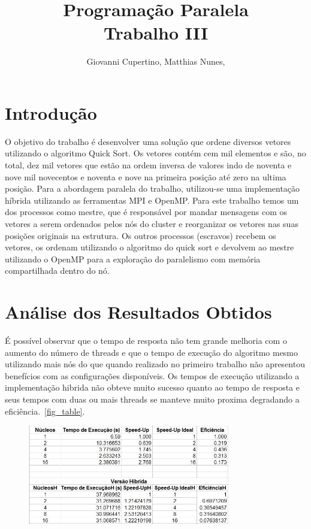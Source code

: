 \documentclass[10pt]{IEEEtran}
\title{Programação Paralela\\ Trabalho III}
\author{Giovanni Cupertino, Matthias Nunes, \IEEEmembership{Usuário pp12820}}
\begin{document}
\maketitle

\section{Introdução}

	O objetivo do trabalho é desenvolver uma solução que ordene diversos vetores
	utilizando o algoritmo Quick Sort.  Os vetores contém cem mil elementos e
	são, no total, dez mil vetores que estão na ordem inversa de valores indo de
	noventa e nove mil novecentos e noventa e nove na primeira posição até zero
	na ultima posição.  Para a abordagem paralela do trabalho, utilizou-se uma
	implementação híbrida utilizando as ferramentas MPI e OpenMP\@. Para este 
	trabalho temos um dos processos como mestre, que é responsável por mandar 
	mensagens com os vetores a serem ordenados pelos nós do cluster e reorganizar
	os vetores nas suas posições originais na estrutura. Os outros processos 
	(escravos) recebem os vetores, os ordenam utilizando o algoritmo do quick sort
	e devolvem ao mestre utilizando o OpenMP para a exploração do paralelismo com 
	memória compartilhada dentro do nó.

\section{Análise dos Resultados Obtidos}

	É possível observar que o tempo de resposta não tem grande melhoria com o
	aumento do número de threads e que o tempo de execução do algoritmo mesmo 
	utilizando mais nós do que quando realizado no primeiro trabalho não apresentou
	benefícios com as configurações disponíveis. Os tempos de execução utilizando
	a implementação hibrida não obteve muito sucesso quanto ao tempo de resposta
	e seus tempos com duas ou mais threads se manteve muito proxima degradando a
	eficiência.~\ref{fig_table}.

	\begin{figure}[H]
		\centering
		\includegraphics[width=88mm]{table.png}
		\label{fig_graph}
	\end{figure}
\end{document}
